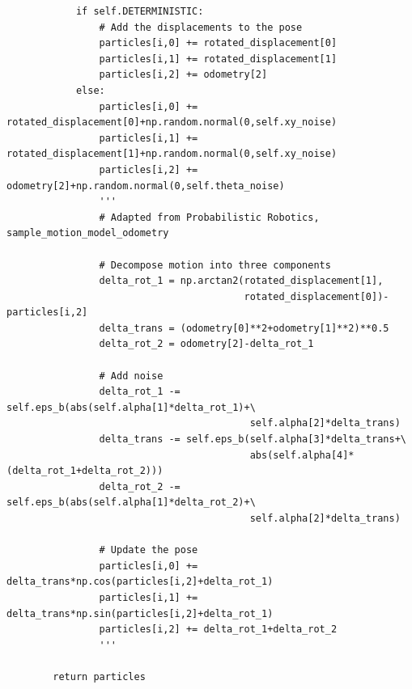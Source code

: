 \documentclass{article}
\begin{document}
{\begin{verbatim}
            if self.DETERMINISTIC:
                # Add the displacements to the pose
                particles[i,0] += rotated_displacement[0]
                particles[i,1] += rotated_displacement[1]
                particles[i,2] += odometry[2]
            else:
                particles[i,0] += rotated_displacement[0]+np.random.normal(0,self.xy_noise)
                particles[i,1] += rotated_displacement[1]+np.random.normal(0,self.xy_noise)
                particles[i,2] += odometry[2]+np.random.normal(0,self.theta_noise)
                '''
                # Adapted from Probabilistic Robotics, sample_motion_model_odometry
                
                # Decompose motion into three components
                delta_rot_1 = np.arctan2(rotated_displacement[1],
                                         rotated_displacement[0])-particles[i,2]
                delta_trans = (odometry[0]**2+odometry[1]**2)**0.5
                delta_rot_2 = odometry[2]-delta_rot_1
                
                # Add noise
                delta_rot_1 -= self.eps_b(abs(self.alpha[1]*delta_rot_1)+\
                                          self.alpha[2]*delta_trans)
                delta_trans -= self.eps_b(self.alpha[3]*delta_trans+\
                                          abs(self.alpha[4]*(delta_rot_1+delta_rot_2)))
                delta_rot_2 -= self.eps_b(abs(self.alpha[1]*delta_rot_2)+\
                                          self.alpha[2]*delta_trans)
                
                # Update the pose
                particles[i,0] += delta_trans*np.cos(particles[i,2]+delta_rot_1)
                particles[i,1] += delta_trans*np.sin(particles[i,2]+delta_rot_1)
                particles[i,2] += delta_rot_1+delta_rot_2
                '''
        
        return particles


\end{verbatim}
}
\end{document}
